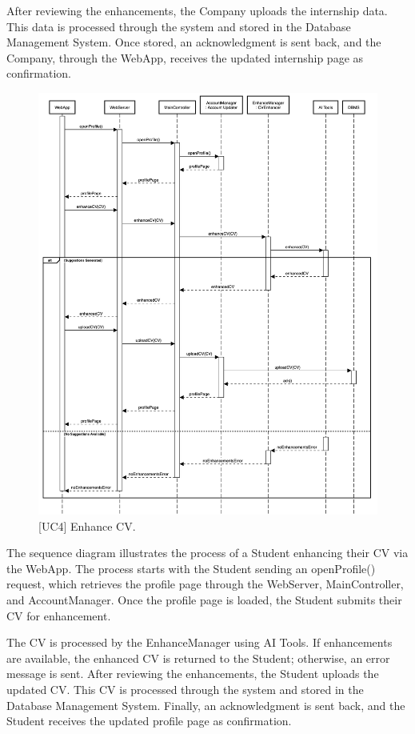 After reviewing the enhancements, the Company uploads the internship data. This data is processed through the system and stored in the Database Management System. Once stored, an acknowledgment is sent back, and the Company, through the WebApp, receives the updated internship page as confirmation.

\begin{figure}[htbp]
    \centering
    \includegraphics[width=\linewidth]{DD/Images/sequenceDiagrams/enhanceCV.png}
    \caption{[UC4] Enhance CV.}
    \label{fig:enhanceCV_immagine}
\end{figure}
\clearpage

The sequence diagram illustrates the process of a Student enhancing their CV via the WebApp. The process starts with the Student sending an openProfile() request, which retrieves the profile page through the WebServer, MainController, and AccountManager. Once the profile page is loaded, the Student submits their CV for enhancement.

The CV is processed by the EnhanceManager using AI Tools. If enhancements are available, the enhanced CV is returned to the Student; otherwise, an error message is sent. After reviewing the enhancements, the Student uploads the updated CV. This CV is processed through the system and stored in the Database Management System. Finally, an acknowledgment is sent back, and the Student receives the updated profile page as confirmation.

